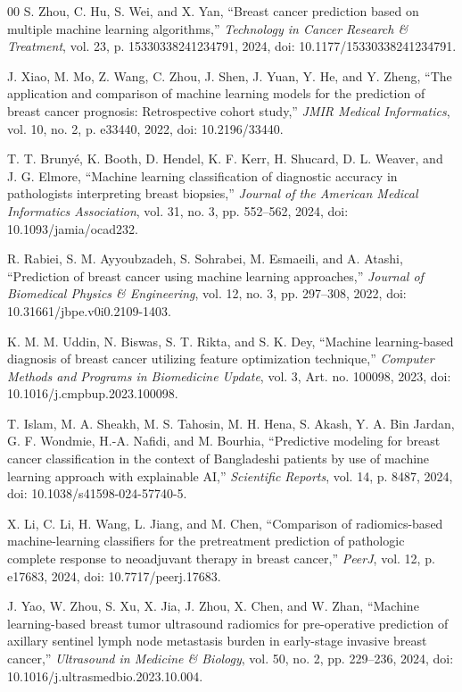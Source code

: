 \documentclass[conference]{IEEEtran}
\begin{document}
\begin{thebibliography}{00}
 S. Zhou, C. Hu, S. Wei, and X. Yan, ``Breast cancer prediction based on multiple machine learning algorithms,'' \textit{Technology in Cancer Research \& Treatment}, vol. 23, p. 15330338241234791, 2024, doi: 10.1177/15330338241234791.

 J. Xiao, M. Mo, Z. Wang, C. Zhou, J. Shen, J. Yuan, Y. He, and Y. Zheng, ``The application and comparison of machine learning models for the prediction of breast cancer prognosis: Retrospective cohort study,'' \textit{JMIR Medical Informatics}, vol. 10, no. 2, p. e33440, 2022, doi: 10.2196/33440.

 T. T. Bruny\'e, K. Booth, D. Hendel, K. F. Kerr, H. Shucard, D. L. Weaver, and J. G. Elmore, ``Machine learning classification of diagnostic accuracy in pathologists interpreting breast biopsies,'' \textit{Journal of the American Medical Informatics Association}, vol. 31, no. 3, pp. 552--562, 2024, doi: 10.1093/jamia/ocad232.

 R. Rabiei, S. M. Ayyoubzadeh, S. Sohrabei, M. Esmaeili, and A. Atashi, ``Prediction of breast cancer using machine learning approaches,'' \textit{Journal of Biomedical Physics \& Engineering}, vol. 12, no. 3, pp. 297--308, 2022, doi: 10.31661/jbpe.v0i0.2109-1403.

 K. M. M. Uddin, N. Biswas, S. T. Rikta, and S. K. Dey, ``Machine learning-based diagnosis of breast cancer utilizing feature optimization technique,'' \textit{Computer Methods and Programs in Biomedicine Update}, vol. 3, Art. no. 100098, 2023, doi: 10.1016/j.cmpbup.2023.100098.

 T. Islam, M. A. Sheakh, M. S. Tahosin, M. H. Hena, S. Akash, Y. A. Bin Jardan, G. F. Wondmie, H.-A. Nafidi, and M. Bourhia, ``Predictive modeling for breast cancer classification in the context of Bangladeshi patients by use of machine learning approach with explainable AI,'' \textit{Scientific Reports}, vol. 14, p. 8487, 2024, doi: 10.1038/s41598-024-57740-5.

 X. Li, C. Li, H. Wang, L. Jiang, and M. Chen, ``Comparison of radiomics-based machine-learning classifiers for the pretreatment prediction of pathologic complete response to neoadjuvant therapy in breast cancer,'' \textit{PeerJ}, vol. 12, p. e17683, 2024, doi: 10.7717/peerj.17683.

 J. Yao, W. Zhou, S. Xu, X. Jia, J. Zhou, X. Chen, and W. Zhan, ``Machine learning-based breast tumor ultrasound radiomics for pre-operative prediction of axillary sentinel lymph node metastasis burden in early-stage invasive breast cancer,'' \textit{Ultrasound in Medicine \& Biology}, vol. 50, no. 2, pp. 229--236, 2024, doi: 10.1016/j.ultrasmedbio.2023.10.004.


\end{thebibliography}
\end{document}

